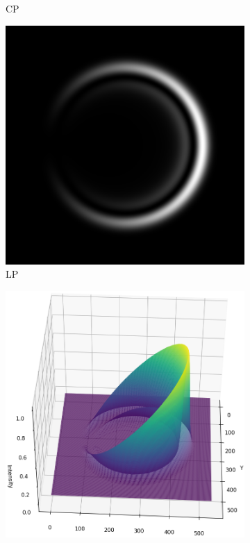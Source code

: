 \documentclass[11pt, a4paper, twoside]{article} %
\begin{document}
\begin{figure}[h!]
\begin{subfigure}[b]{0.25\linewidth}
    \caption{CP }
     \end{subfigure}
 \begin{subfigure}[b]{0.24\linewidth}
     \includegraphics[width=\linewidth]{simul13.png}
     \caption{LP}
     \end{subfigure}
  \begin{subfigure}[b]{0.25\linewidth}
     \includegraphics[width=\linewidth]{simul14.png}

\end{subfigure}
\end{figure}
\end{document}
